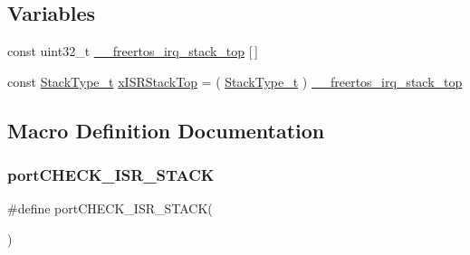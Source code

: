 \subsection*{Variables}
\begin{DoxyCompactItemize}
\item 
const uint32\+\_\+t \hyperlink{externals_2freertos_2portable_2_g_c_c_2_r_i_s_c-_v_2port_8c_a79855bf4f17a0196e1168d58bf49f525}{\+\_\+\+\_\+freertos\+\_\+irq\+\_\+stack\+\_\+top} \mbox{[}$\,$\mbox{]}
\item 
const \hyperlink{externals_2freertos_2portable_2_g_c_c_2_a_r_m___c_m0_2portmacro_8h_a84e9a8ba132feed0b2401c1f4e2ac63c}{Stack\+Type\+\_\+t} \hyperlink{externals_2freertos_2portable_2_g_c_c_2_r_i_s_c-_v_2port_8c_a9e56109acb5aa444fc39ac7f8e9b6719}{x\+I\+S\+R\+Stack\+Top} = ( \hyperlink{externals_2freertos_2portable_2_g_c_c_2_a_r_m___c_m0_2portmacro_8h_a84e9a8ba132feed0b2401c1f4e2ac63c}{Stack\+Type\+\_\+t} ) \hyperlink{externals_2freertos_2portable_2_g_c_c_2_r_i_s_c-_v_2port_8c_a79855bf4f17a0196e1168d58bf49f525}{\+\_\+\+\_\+freertos\+\_\+irq\+\_\+stack\+\_\+top}
\end{DoxyCompactItemize}


\subsection{Macro Definition Documentation}
\mbox{\label{externals_2freertos_2portable_2_g_c_c_2_r_i_s_c-_v_2port_8c_a675a9ea33bf706283cbc295bfff06335}} 
\subsubsection{\texorpdfstring{port\+C\+H\+E\+C\+K\+\_\+\+I\+S\+R\+\_\+\+S\+T\+A\+CK}{portCHECK\_ISR\_STACK}}
{\footnotesize\ttfamily \#define port\+C\+H\+E\+C\+K\+\_\+\+I\+S\+R\+\_\+\+S\+T\+A\+CK(\begin{DoxyParamCaption}{ }\end{DoxyParamCaption})}

